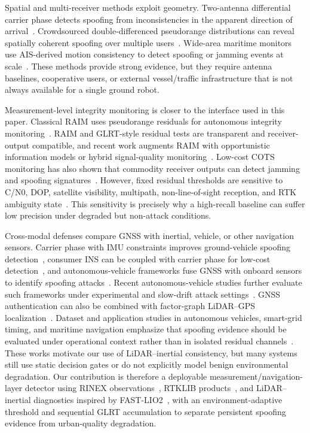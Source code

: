 \documentclass[journal]{IEEEtran}
\begin{document}
Spatial and multi-receiver methods exploit geometry.
Two-antenna differential carrier phase detects spoofing from inconsistencies in the apparent direction of arrival~\cite{psiaki2014twoantenna}.
Crowdsourced double-differenced pseudorange distributions can reveal spatially coherent spoofing over multiple users~\cite{chen2024d2sp}.
Wide-area maritime monitors use AIS-derived motion consistency to detect spoofing or jamming events at scale~\cite{spravil2023nmea,park2026ais}.
These methods provide strong evidence, but they require antenna baselines, cooperative users, or external vessel/traffic infrastructure that is not always available for a single ground robot.

Measurement-level integrity monitoring is closer to the interface used in this paper.
Classical RAIM uses pseudorange residuals for autonomous integrity monitoring~\cite{parkinson1988raim,brown1992raim}.
RAIM and GLRT-style residual tests are transparent and receiver-output compatible, and recent work augments RAIM with opportunistic information models or hybrid signal-quality monitoring~\cite{liu2024gmraim,zheng2023hapsraim}.
Low-cost COTS monitoring has also shown that commodity receiver outputs can detect jamming and spoofing signatures~\cite{kriezis2025cots}.
However, fixed residual thresholds are sensitive to C/N0, DOP, satellite visibility, multipath, non-line-of-sight reception, and RTK ambiguity state~\cite{suzuki2024multipath}.
This sensitivity is precisely why a high-recall baseline can suffer low precision under degraded but non-attack conditions.

Cross-modal defenses compare GNSS with inertial, vehicle, or other navigation sensors.
Carrier phase with IMU constraints improves ground-vehicle spoofing detection~\cite{clements2022carrierimu}, consumer INS can be coupled with carrier phase for low-cost detection~\cite{johansson2025consumerins}, and autonomous-vehicle frameworks fuse GNSS with onboard sensors to identify spoofing attacks~\cite{dasgupta2022sensorfusion}.
Recent autonomous-vehicle studies further evaluate such frameworks under experimental and slow-drift attack settings~\cite{dasgupta2024experimental,dasgupta2024slowdrift}.
GNSS authentication can also be combined with factor-graph LiDAR--GPS localization~\cite{dai2023chimera}.
Dataset and application studies in autonomous vehicles, smart-grid timing, and maritime navigation emphasize that spoofing evidence should be evaluated under operational context rather than in isolated residual channels~\cite{leite2021gnsssd,risbud2018smartgrid,androjna2020maritime}.
These works motivate our use of LiDAR--inertial consistency, but many systems still use static decision gates or do not explicitly model benign environmental degradation.
Our contribution is therefore a deployable measurement/navigation-layer detector using RINEX observations~\cite{rinex304}, RTKLIB products~\cite{rtklib}, and LiDAR--inertial diagnostics inspired by FAST-LIO2~\cite{fastlio2}, with an environment-adaptive threshold and sequential GLRT accumulation to separate persistent spoofing evidence from urban-quality degradation.
\end{document}
